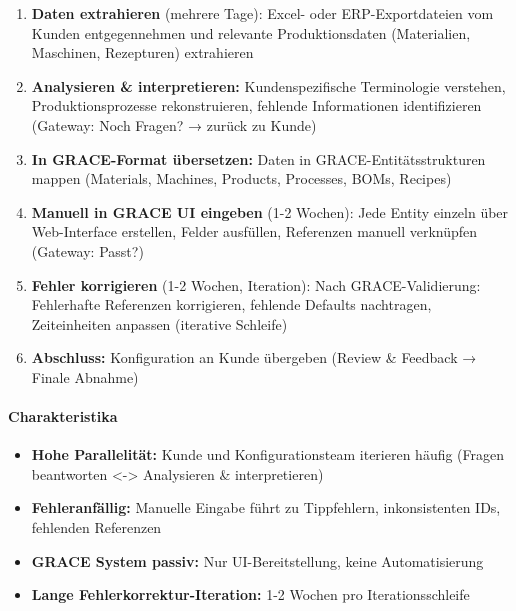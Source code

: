 \begin{enumerate}
    \item \textbf{Daten extrahieren} (mehrere Tage): Excel- oder ERP-Exportdateien vom Kunden entgegennehmen und relevante Produktionsdaten (Materialien, Maschinen, Rezepturen) extrahieren

    \item \textbf{Analysieren \& interpretieren:} Kundenspezifische Terminologie verstehen, Produktionsprozesse rekonstruieren, fehlende Informationen identifizieren (Gateway: \glqq Noch Fragen?\grqq{} → zurück zu Kunde)

    \item \textbf{In GRACE-Format übersetzen:} Daten in GRACE-Entitätsstrukturen mappen (Materials, Machines, Products, Processes, BOMs, Recipes)

    \item \textbf{Manuell in GRACE UI eingeben} (1-2 Wochen): Jede Entity einzeln über Web-Interface erstellen, Felder ausfüllen, Referenzen manuell verknüpfen (Gateway: \glqq Passt?\grqq{})

    \item \textbf{Fehler korrigieren} (1-2 Wochen, Iteration): Nach GRACE-Validierung: Fehlerhafte Referenzen korrigieren, fehlende Defaults nachtragen, Zeiteinheiten anpassen (iterative Schleife)

    \item \textbf{Abschluss:} Konfiguration an Kunde übergeben (Review \& Feedback → Finale Abnahme)
\end{enumerate}

\paragraph{Charakteristika}

\begin{itemize}
    \item \textbf{Hohe Parallelität:} Kunde und Konfigurationsteam iterieren häufig (\glqq Fragen beantworten\grqq{} <-> \glqq Analysieren \& interpretieren\grqq{})
    \item \textbf{Fehleranfällig:} Manuelle Eingabe führt zu Tippfehlern, inkonsistenten IDs, fehlenden Referenzen
    \item \textbf{GRACE System passiv:} Nur UI-Bereitstellung, keine Automatisierung
    \item \textbf{Lange Fehlerkorrektur-Iteration:} 1-2 Wochen pro Iterationsschleife
\end{itemize}

